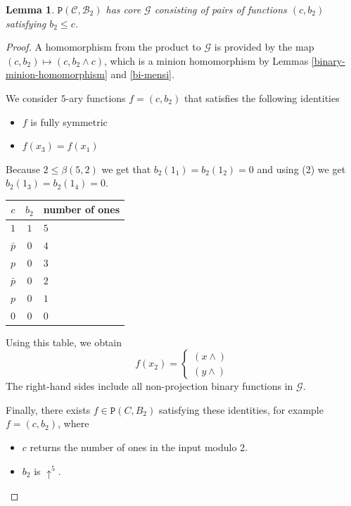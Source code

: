 \documentclass{amsart}
\numberwithin{equation}{section}
\theoremstyle{plain}
\newtheorem{lemma}[theorem]{Lemma}
\theoremstyle{definition}
\def\clone#1{\mathcal{#1}}
\def\minion#1{\mathcal{#1}}
\def\Bc{\clone{B}}
\def\Cc{\clone{C}}
\def\atleast#1{\uparrow^{#1}}
\def\C#1{{\mathtt{P}}(#1)}
\begin{document}
\begin{lemma}\label{cb2} $\C{\Cc,\Bc_2}$ has core $\minion{G}$ consisting of pairs of functions $(c,b_2)$ satisfying $b_2 \leq c$.
\end{lemma}
\begin{proof}
  A homomorphism from the product to $\minion{G}$ is provided by the map $(c,b_2)\mapsto (c, b_2\wedge c)$, which is a minion homomorphism by Lemmas \ref{binary-minion-homomorphism} and \ref{bi-mensi}.

We consider $5$-ary functions $f= (c, b_2)$ that satisfies the following identities
\begin{itemize}
    \item $f$ is fully symmetric
    \item $f(x_3) = f(x_1)$
\end{itemize}
Because $2\leq \beta(5,2)$ we get that $b_2(1_1) = b_2(1_2) = 0$ and using (2) we get $b_2(1_3) = b_2(1_4) = 0$.

\begin{center}
\begin{tabular}{ |cc|l } 
 \hline
 $c$ & $b_2$ & number of ones \\ 
  \hline
     $1$ & $1$ & $5$ \\ 
     $\bar{p}$ & $0$ & $4$ \\ 
     $p$ & $0$ & $3$ \\ 
     $\bar{p}$ & $0$ & $2$ \\ 
     $p$ & $0$ & $1$ \\ 
     $0$ & $0$ & $0$ \\ 
 \hline
\end{tabular}
\end{center}

Using this table, we obtain
$$f(x_2) = \left\{\begin{matrix}(x{\wedge}) \\ (y{\wedge})\end{matrix}\right.$$
The right-hand sides include all non-projection binary functions in $\minion{G}$.

Finally, there exists $f\in\C{C,B_2}$ satisfying these identities, for example $f=(c,b_2)$, where
\begin{itemize}
\item $c$ returns the number of ones in the input modulo 2.
\item $b_2$ is $\atleast{5}$.
\end{itemize}
\end{proof}
\end{document}
